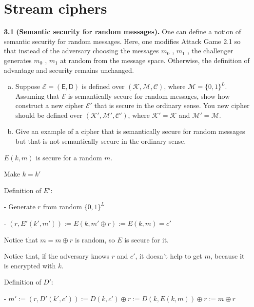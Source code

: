 \chapter{Stream ciphers}

\noindent
\textbf{3.1}
\textbf{(Semantic security for random messages).} One can define a notion of semantic security for random messages.
Here, one modifies Attack Game 2.1 so that instead of the adversary choosing the messages $m_0$ , $m_1$ , the challenger generates $m_0$ , $m_1$ at random from the message space.
Otherwise, the definition of advantage and security remains unchanged.

\begin{enumerate}[(a)]
\item Suppose $\mathcal{E}=(\mathsf{E},\mathsf{D})$ is defined over $(\mathcal{K},\mathcal{M},\mathcal{C})$, where $\mathcal{M}=\{0,1\}^L$. Assuming that $\mathcal{E}$ is semantically secure for random messages, show how construct a new cipher $\mathcal{E}'$ that is secure in the ordinary sense. You new cipher should be defined over $(\mathcal{K}',\mathcal{M}',\mathcal{C}')$, where $\mathcal{K}'=\mathcal{K}$ and $\mathcal{M}'=\mathcal{M}$.
\item Give an example of a cipher that is semantically secure for random messages but that is not semantically secure in the ordinary sense.
\end{enumerate}

\begin{tcolorbox}[solutionbox, title=Answer: (a)]
    $E(k, m)$ is secure for a random $m$.

    Make $k = k'$
    \vspace{1em}

    Definition of $E'$:

    - Generate $r$ from random $\{0,1\}^L$

    - $(r, E'(k', m')) := E(k, m' \oplus r) := E(k, m) = c'$
    \vspace{1em}

    Notice that $m = m \oplus r$ is random, so $E$ is secure for it.

    Notice that, if the adversary knows $r$ and $c'$, it doesn't help to get $m$, because it is encrypted with $k$.
    \vspace{1em}

    Definition of $D'$:

    - $m':= (r, D'(k', c')) := D(k, c') \oplus r := D(k, E(k, m)) \oplus r := m \oplus r$
\end{tcolorbox}


